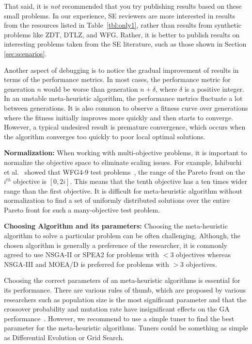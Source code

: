 \documentclass[sigconf,anonymous,review]{acmart}
\newcommand\TODO[1]{\textcolor{ScarletRed}{\textbf{\colorbox{yellow}{\small TODO:}} \emph{#1}}\xspace}
\begin{document}
  That said, it is {\em not} recommended that you try publishing results based on these small {problems}. In our experience, SE reviewers are more interested in results from the resources listed in Table~\ref{tbl:only1}, rather than results from   synthetic {problems} like ZDT, DTLZ, and WFG. Rather, it is better to publish results on interesting
  problems taken from the SE literature, such as those shown in Section \ref{sec:scenarios}.
  
  Another aspect of debugging is to notice the gradual improvement of results in terms of the performance metrics. In most cases, the performance metric for generation $n$ would be worse than generation $n+\delta$, where $\delta$ is a positive integer. In an unstable meta-heuristic algorithm, the performance metrics fluctuate a lot between generations. 
  {It is also common to observe a fitness curve over generations where the fitness initially improves more quickly and then starts to converge. However, a typical undesired result is premature convergence, which occurs when the algorithm converges too quickly to poor local optimal solutions.}

  \noindent\textbf{Normalization: } When working with multi-objective problems, it is important to normalize the objective space to eliminate scaling issues. For example, Ishibuchi et al.~\cite{ishibuchi2017effect} showed that WFG4-9 test problems~\cite{huband2006review}, the range
of the Pareto front on the $i^{th}$ objective is $[0, 2i]$. This means
that the tenth objective has a ten times wider range than
the first objective. It is difficult for meta-heuristic algorithm without normalization
to find a set of uniformly distributed solutions over the entire Pareto front for such a many-objective test
problem. 

\noindent\textbf{Choosing Algorithm and its parameters: } {Choosing the meta-heuristic algorithm to solve a particular problem can be often challenging. Although, the chosen algorithm is generally a preference of the researcher, it is commonly agreed to use NSGA-II or SPEA2 for problems with $<3$ objectives whereas NSGA-III and MOEA/D is preferred for problems with $>3$ objectives.}

{Choosing the correct parameters of an meta-heuristic algorithms is essential for its performance. There are various rules of thumb, which are proposed by various researchers such as population size is the most significant parameter and that the crossover probability and mutation rate have insignificant effects on the GA performance~\cite{alajmi2014selecting}. However, we recommend to use a simple tuner to find the best parameter for the meta-heuristic algorithms. Tuners could be something as simple as Differential Evolution or Grid Search. }
\end{document}
